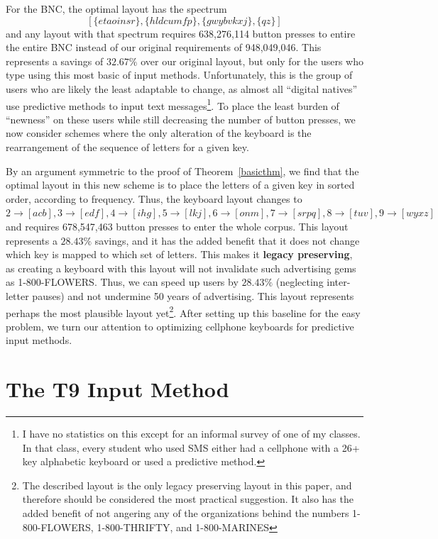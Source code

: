 \documentclass[runningheads]{llncs}
\newcommand{\newword}[1]{{\bf #1}}
\begin{document}
For the BNC, the optimal layout has the spectrum $$[\{etaoinsr\}, \{hldcumfp\},
\{gwybvkxj\}, \{qz\}]$$ and any layout with that spectrum requires 638,276,114
button presses to entire the entire BNC instead of our original requirements of
948,049,046.  This represents a savings of $32.67\%$ over our original layout,
but only for the users who type using this most basic of input methods.
Unfortunately, this is the group of users who are likely the least adaptable to
change, as almost all ``digital natives'' use predictive methods to input text
messages\footnote{I have no statistics on this except for an informal survey of
one of my classes.  In that class, every student who used SMS either had a
cellphone with a 26+ key alphabetic keyboard or used a predictive method.}. 
To place the least burden of ``newness'' on these users while still
decreasing the number of button presses, we now consider schemes where the only
alteration of the keyboard is the rearrangement of the sequence of letters for
a given key.

By an argument symmetric to the proof of Theorem~\ref{basicthm}, we find that
the optimal layout in this new scheme is to place the letters of a given key in
sorted order, according to frequency.  Thus, the keyboard layout changes to
$2\to[acb], 3\to[edf], 4\to[ihg], 5\to[lkj], 6\to[onm], 7\to[srpq], 8\to[tuv],
9\to[wyxz]$ and requires 678,547,463 button presses to enter the whole corpus.
This layout represents a $28.43\%$ savings, and it has the added benefit that
it does not change which key is mapped to which set of letters.  This makes it
\newword{legacy preserving}, as creating a keyboard with this layout will not
invalidate such advertising gems as 1-800-FLOWERS.  Thus, we can speed up users
by $28.43\%$ (neglecting inter-letter pauses) and not undermine 50 years of
advertising.  This layout represents perhaps the most plausible layout
yet\footnote{The described layout is the only legacy preserving layout in this
paper, and therefore should be considered the most practical suggestion.  It
also has the added benefit of not angering any of the organizations behind the
numbers 1-800-FLOWERS, 1-800-THRIFTY, and 1-800-MARINES}.  After setting up
this baseline for the easy problem, we turn our attention to optimizing
cellphone keyboards for predictive input methods.

\section{The T9 Input Method}
\end{document}
